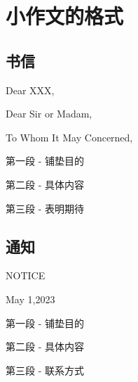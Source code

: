 \chapter*{小作文的格式}

\section*{书信}

\noindent Dear XXX,

\noindent Dear Sir or Madam,

\noindent To Whom It May Concerned,

第一段 - 铺垫目的

第二段 - 具体内容

第三段 - 表明期待

\YS

\LM

\section*{通知}

\begin{center}
    NOTICE

    \quad{}\quad{}
    \quad{}\quad{}
    \quad{}\quad{}
    May 1,2023
\end{center}

第一段 - 铺垫目的

第二段 - 具体内容

第三段 - 联系方式


